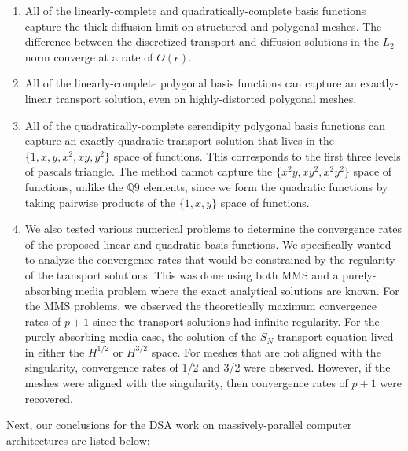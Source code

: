 \begin{enumerate}
\item All of the linearly-complete and quadratically-complete basis functions capture the thick diffusion limit on structured and polygonal meshes. The difference between the discretized transport and diffusion solutions in the $L_2$-norm converge at a rate of $O(\epsilon)$.
\item All of the linearly-complete polygonal basis functions can capture an exactly-linear transport solution, even on highly-distorted polygonal meshes.
\item All of the quadratically-complete serendipity polygonal basis functions can capture an exactly-quadratic transport solution that lives in the $\{ 1,x,y,x^2,xy,y^2\}$ space of functions. This corresponds to the first three levels of pascals triangle. The method cannot capture the $\{ x^2y,xy^2,x^2y^2\}$ space of functions, unlike the $\mathbb{Q}9$ elements, since we form the quadratic functions by taking pairwise products of the $\{ 1,x,y\}$ space of functions.
\item We also tested various numerical problems to determine the convergence rates of the proposed linear and quadratic basis functions. We specifically wanted to analyze the convergence rates that would be constrained by the regularity of the transport solutions. This was done using both MMS and a purely-absorbing media problem where the exact analytical solutions are known. For the MMS problems, we observed the theoretically maximum convergence rates of $p+1$ since the transport solutions had infinite regularity. For the purely-absorbing media case, the solution of the $S_N$ transport equation lived in either the $H^{1/2}$ or $H^{3/2}$ space. For meshes that are not aligned with the singularity, convergence rates of 1/2 and 3/2 were observed. However, if the meshes were aligned with the singularity, then convergence rates of $p+1$ were recovered.
\end{enumerate}

Next, our conclusions for the DSA work on massively-parallel computer architectures are listed below:

